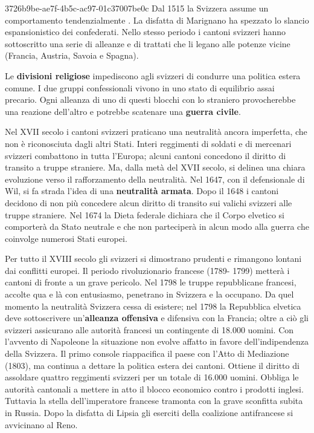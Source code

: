 \documentclass[preview]{standalone}
\begin{document}
\begin{snippet}{3726b9be-ae7f-4b5c-ac97-01c37007be0c}
    Dal 1515 la Svizzera assume un comportamento tendenzialmente .
    La disfatta di Marignano ha spezzato lo slancio espansionistico dei confederati.
    Nello stesso periodo i cantoni svizzeri hanno sottoscritto una serie di
    alleanze e di trattati che li legano alle potenze vicine
    (Francia, Austria, Savoia e Spagna).
    
    Le \textbf{divisioni religiose} impediscono agli svizzeri di condurre una politica estera comune. I due
    gruppi confessionali vivono in uno stato di equilibrio assai precario. Ogni alleanza di uno di
    questi blocchi con lo straniero provocherebbe una reazione dell'altro e potrebbe scatenare una
    \textbf{guerra civile}.
    
    Nel XVII secolo i cantoni svizzeri praticano una neutralità ancora imperfetta, che non è
    riconosciuta dagli altri Stati. Interi reggimenti di soldati e di mercenari svizzeri combattono in
    tutta l'Europa; alcuni cantoni concedono il diritto di transito a truppe straniere. Ma, dalla metà
    del XVII secolo, si delinea una chiara evoluzione verso il rafforzamento della neutralità. Nel
    1647, con il defensionale di Wil, si fa strada l'idea di una \textbf{neutralità armata}. Dopo il 1648 i
    cantoni decidono di non più concedere alcun diritto di transito sui valichi svizzeri alle truppe
    straniere. Nel 1674 la Dieta federale dichiara che il Corpo elvetico si comporterà da Stato
    neutrale e che non parteciperà in alcun modo alla guerra che coinvolge numerosi Stati europei.
    
    Per tutto il XVIII secolo gli svizzeri si dimostrano prudenti e rimangono lontani dai conflitti
    europei. Il periodo rivoluzionario francese (1789- 1799) metterà i cantoni di fronte a un grave
    pericolo. Nel 1798 le truppe repubblicane francesi, accolte qua e là con entusiasmo, penetrano
    in Svizzera e la occupano. Da quel momento la neutralità Svizzera cessa di esistere; nel 1798 la
    Repubblica elvetica deve sottoscrivere un'\textbf{alleanza offensiva} e difensiva con la Francia; oltre
    a ciò gli svizzeri assicurano alle autorità francesi un contingente di 18.000 uomini. Con
    l'avvento di Napoleone la situazione non evolve affatto in favore dell'indipendenza della
    Svizzera. Il primo console riappacifica il paese con l'Atto di Mediazione (1803), ma continua a
    dettare la politica estera dei cantoni. Ottiene il diritto di assoldare quattro reggimenti svizzeri
    per un totale di 16.000 uomini. Obbliga le autorità cantonali a mettere in atto il blocco
    economico contro i prodotti inglesi. Tuttavia la stella dell'imperatore francese tramonta con la
    grave sconfitta subita in Russia. Dopo la disfatta di Lipsia gli eserciti della coalizione
    antifrancese si avvicinano al Reno.
\end{snippet}
\end{document}
